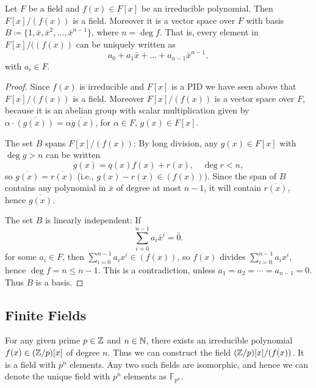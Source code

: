 \documentclass[10pt, a4paper]{article}
\begin{document}
\begin{theorem}
    Let $F$ be a field and $f(x) \in F[x]$ be an irreducible polynomial.
    Then $F[x] / (f(x))$ is a field.
    Moreover it is a vector space over $F$ with basis $B \coloneqq \{1, \bar{x}, \bar{x} ^ 2, \dotsc, \bar{x} ^ {n - 1}\}$,
    where $n = \deg{f}$.
    That is,
    every element in $F[x] / ((f(x))$ can be uniquely written as
    \[
    a_0 + a_1\bar{x} + \dotsc + a_{n - 1}\bar{x} ^ {n - 1},
    \]
    with $a_i \in F$.

    \begin{proof}
        Since $f(x)$ is irreducible and $F[x]$ is a PID we have seen above that $F[x] / (f(x))$ is a field.
        Moreover $F[x] / (f(x))$ is a vector space over $F$,
        because it is an abelian group with scalar multiplication given by $\alpha \cdot \overline{(g(x))} = \overline{\alpha g(x)}$,
        for $\alpha \in F$,
        $g(x) \in F[x]$.

        The set $B$ spans $F[x] / (f(x))$:
        By long division,
        any $g(x) \in F[x]$ with $\deg{g} > n$ can be written
        \[
        g(x) = q(x)f(x) + r(x),\quad \deg{r} < n,
        \]
        so $\overline{g(x)} = \overline{r(x)}$
        (i.e.,
        $g(x) - r(x) \in (f(x))$).
        Since the span of $B$ contains any polynomial in $\bar{x}$ of degree at most $n - 1$,
        it will contain $\overline{r(x)}$,
        hence $\overline{g(x)}$.

        The set $B$ is linearly independent:
        If
        \[
        \sum_{i = 0}^{n - 1}a_i\bar{x} ^ i = \bar{0}.
        \]
        for some $a_i \in F$,
        then $\sum_{i = 0}^{n - 1}a_ix ^ i \in (f(x))$,
        so $f(x)$ divides $\sum_{i = 0}^{n - 1}a_ix ^ i$,
        hence $\deg{f} = n \leq n - 1$.
        This is a contradiction,
        unless $a_1 = a_2 = \dotsi = a_{n - 1} = 0$.
        Thus $B$ is a basis.
    \end{proof}
\end{theorem}

\subsection{Finite Fields}

\begin{theorem}
    For any given prime $p \in \mathbb{Z}$ and $n \in \mathbb{N}$,
    there exists an irreducible polynomial $f(x) \in (\mathbb{Z} / p)[x]$ of degree $n$.
    Thus we can construct the field $(\mathbb{Z} / p)[x] / (f(x))$.
    It is a field with $p ^ n$ elements.
    Any two such fields are isomorphic,
    and hence we can denote the unique field with $p ^ n$ elements as $\mathbb{F}_{p ^ n}$.
\end{theorem}
\end{document}
